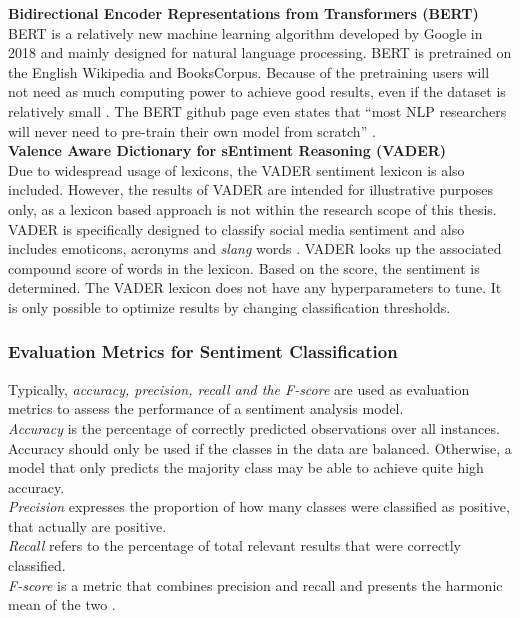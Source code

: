 \documentclass[11pt, a4paper]{article}
\begin{document}
\noindent\textbf{Bidirectional Encoder Representations from Transformers (BERT)}\\
BERT is a relatively new machine learning algorithm developed by Google in 2018 and mainly designed for 
natural language processing. BERT is pretrained on the English Wikipedia and BooksCorpus. Because of the 
pretraining users will not need as much computing power to achieve good results, even if the dataset is relatively 
small \citep{devlin2019bert}. The BERT github page even states that 
“most NLP researchers will never need to pre-train their own model from scratch” \citep{googlegithub}.\\

\noindent\textbf{Valence Aware Dictionary for sEntiment Reasoning (VADER)}\\
Due to widespread usage of lexicons, the VADER sentiment lexicon is also included. However, the results of VADER are intended for illustrative purposes only,
as a lexicon based approach is not within the research scope of this thesis.
VADER is specifically designed to classify social media sentiment and also includes emoticons, acronyms and \emph{slang} words \citep{hutto2015vader}. 
VADER looks up the associated compound score of words in the lexicon. Based on the score, the sentiment is determined.
The VADER lexicon does not have any hyperparameters to tune. It is only possible to optimize results by
changing classification thresholds.

\subsubsection{Evaluation Metrics for Sentiment Classification}
Typically, \emph{accuracy, precision, recall and the F-score} are used as evaluation metrics to assess the performance of a sentiment analysis model. \\
\emph{Accuracy} is the percentage of correctly predicted observations over all instances. Accuracy should only be used if the classes in the data are balanced.
Otherwise, a model that only predicts the majority class may be able to achieve quite high accuracy.\\
\emph{Precision} expresses the proportion of how many classes were classified as positive, that actually are positive.\\
\emph{Recall} refers to the percentage of total relevant results that were correctly classified.\\
\emph{F-score} is a metric that combines precision and recall and presents the harmonic mean of the two \citep{hossin2015evaluationmetrics}.
\end{document}
